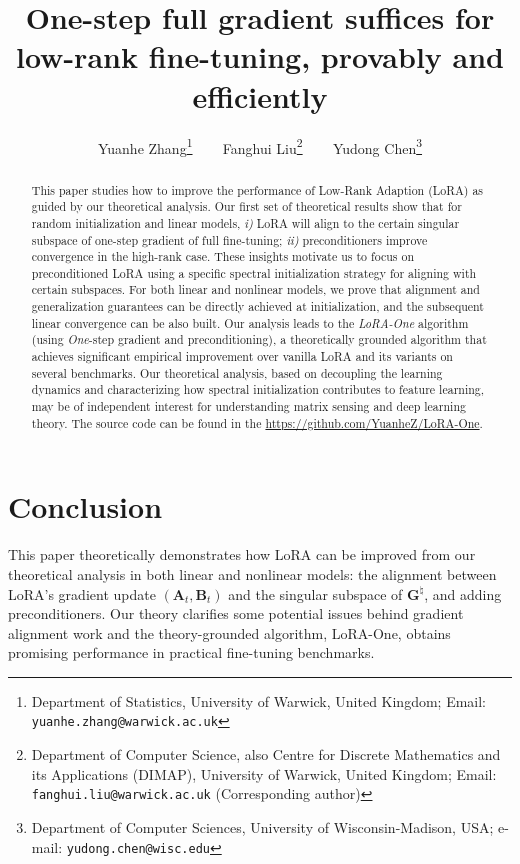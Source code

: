 \documentclass[11pt]{article}
\title{\huge One-step full gradient suffices for low-rank fine-tuning, provably and efficiently}
\author
{
     Yuanhe Zhang\thanks{Department of Statistics, University of Warwick, United Kingdom; Email: {\tt yuanhe.zhang@warwick.ac.uk}} 
     ~~~
     Fanghui Liu\thanks{Department of Computer Science, also Centre for Discrete Mathematics and its Applications (DIMAP), University of Warwick, United Kingdom; Email: {\tt fanghui.liu@warwick.ac.uk} (Corresponding author)} 
     ~~~
     Yudong Chen\thanks{Department of Computer Sciences, University of Wisconsin-Madison, USA; e-mail: {\tt yudong.chen@wisc.edu}}
}
\newcommand{\disableaddcontentsline}{%
  \let\savedaddcontentsline\addcontentsline 
  \renewcommand{\addcontentsline}[3]{}
}
\begin{document}
\disableaddcontentsline
\maketitle

\begin{abstract}
This paper studies how to improve the performance of Low-Rank Adaption (LoRA) \citep{hu2022lora} as guided by our theoretical analysis. 
Our first set of theoretical results show that for random initialization and linear models, \textit{i)} LoRA will align to the certain singular subspace of one-step gradient of full fine-tuning; \textit{ii)} preconditioners improve convergence in the high-rank case.
These insights motivate us to focus on preconditioned LoRA using a specific spectral initialization strategy for aligning with certain subspaces.
For both linear and nonlinear models, we prove that alignment and generalization guarantees can be directly achieved at initialization, and the subsequent linear convergence can be also built.
Our analysis leads to the \emph{LoRA-One} algorithm (using \emph{One}-step gradient and preconditioning), a theoretically grounded algorithm that achieves significant empirical improvement over vanilla LoRA and its variants on several benchmarks.
Our theoretical analysis, based on decoupling the learning dynamics and characterizing how spectral initialization contributes to feature learning, may be of independent interest for understanding matrix sensing and deep learning theory.
The source code can be found in the \url{https://github.com/YuanheZ/LoRA-One}.

\end{abstract}













\section{Conclusion}
This paper theoretically demonstrates how LoRA can be improved from our theoretical analysis in both linear and nonlinear models: the alignment between LoRA's gradient update $(\bm A_t, \bm B_t)$ and the singular subspace of $\bm G^{\natural}$, and adding preconditioners.
Our theory clarifies some potential issues behind gradient alignment work and the theory-grounded algorithm, LoRA-One, obtains promising performance in practical fine-tuning benchmarks.
\end{document}
